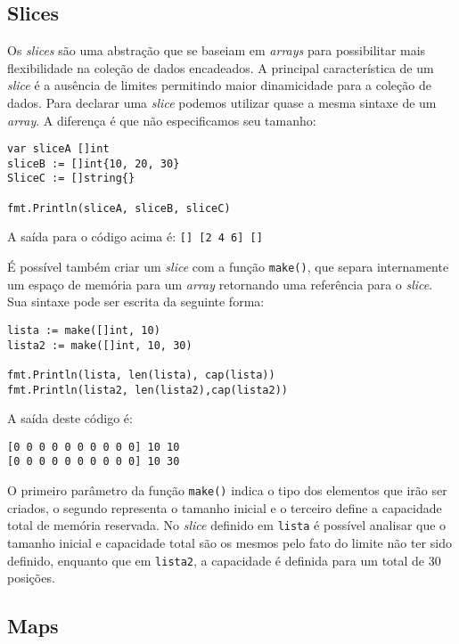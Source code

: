 \documentclass{SBCbookchapter}
\begin{document}
\subsection{Slices}

Os \textit{slices} são uma abstração que se baseiam em \textit{arrays} para possibilitar mais flexibilidade na coleção de dados encadeados. A principal característica de um \textit{slice} é a ausência de limites permitindo maior dinamicidade para a coleção de dados. Para declarar uma \textit{slice} podemos utilizar quase a mesma sintaxe de um \textit{array}. A diferença é que não especificamos seu tamanho:


\begin{lstlisting}
var sliceA []int
sliceB := []int{10, 20, 30}
SliceC := []string{}

fmt.Println(sliceA, sliceB, sliceC)
\end{lstlisting}

A saída para o código acima é: \texttt{[] [2 4 6] []}

É possível também criar um \textit{slice} com a função \texttt{make()}, que separa internamente um espaço de memória para um \textit{array} retornando uma referência para o \textit{slice}. Sua sintaxe pode ser escrita da seguinte forma:

\begin{lstlisting}
lista := make([]int, 10)
lista2 := make([]int, 10, 30)

fmt.Println(lista, len(lista), cap(lista))
fmt.Println(lista2, len(lista2),cap(lista2))
\end{lstlisting}

A saída deste código é:

\noindent\texttt{[0 0 0 0 0 0 0 0 0 0] 10 10}\\
\texttt{[0 0 0 0 0 0 0 0 0 0] 10 30}

O primeiro parâmetro da função \texttt{make()} indica o tipo dos elementos que irão ser criados, o segundo representa o tamanho inicial e o terceiro define a capacidade total de memória reservada. No \textit{slice} definido em \texttt{lista} é possível analisar que o tamanho inicial e capacidade total são os mesmos pelo fato do limite não ter sido definido, enquanto que em \texttt{lista2}, a capacidade é definida para um total de 30 posições.

\subsection{Maps}
\end{document}
